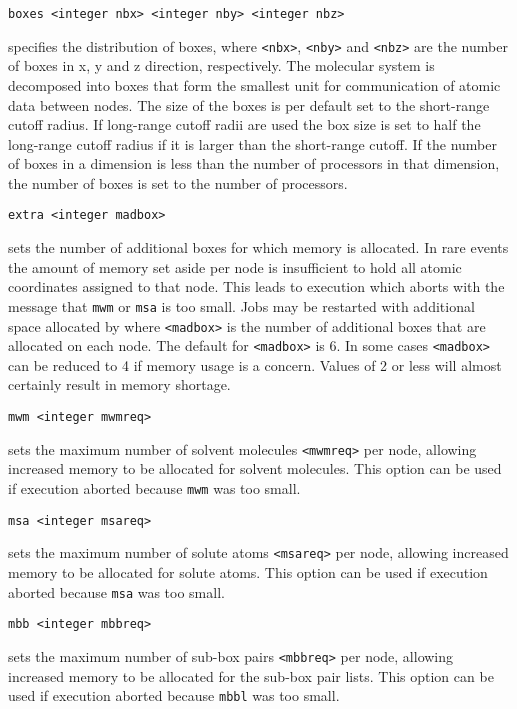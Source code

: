 \begin{description}
\item
\begin{verbatim}
boxes <integer nbx> <integer nby> <integer nbz>
\end{verbatim}
specifies the distribution of boxes,
where \verb+<nbx>+, \verb+<nby>+ and \verb+<nbz>+ are the number of
boxes in x, y and z direction, respectively.
The molecular system is decomposed into boxes that form the smallest
unit for communication of atomic data between nodes. The size of the
boxes is per default set to the short-range cutoff radius. If
long-range cutoff radii  are used the box size is set to half the
long-range cutoff radius if it is larger than the short-range cutoff.
If the number of boxes in a dimension is less than the number of
processors in that dimension, the number of boxes is set to the number
of processors.

\item
\begin{verbatim}
extra <integer madbox>
\end{verbatim}
sets the number of additional boxes for which memory is allocated.
In rare events the amount of memory set aside per node is insufficient
to hold all atomic coordinates assigned to that node. This leads to 
execution which aborts with the message that {\tt mwm} or {\tt msa} is too
small. Jobs may be restarted with additional space allocated by
where \verb+<madbox>+ is the number of additional boxes that are allocated
on each node. The default for \verb+<madbox>+ is 6. 
In some cases \verb+<madbox>+ can be reduced to 4 if memory usage is a
concern. Values of 2 or less will almost certainly result in memory 
shortage.

\item
\begin{verbatim}
mwm <integer mwmreq>
\end{verbatim}
sets the maximum number of solvent molecules \verb+<mwmreq>+ per node,
allowing increased memory to be allocated for solvent molecules. This
option can be used if execution aborted because \verb+mwm+ was too
small.

\item
\begin{verbatim}
msa <integer msareq>
\end{verbatim}
sets the maximum number of solute atoms \verb+<msareq>+ per node,
allowing increased memory to be allocated for solute atoms. This
option can be used if execution aborted because \verb+msa+ was too
small.

\item
\begin{verbatim}
mbb <integer mbbreq>
\end{verbatim}
sets the maximum number of sub-box pairs \verb+<mbbreq>+ per node,
allowing increased memory to be allocated for the sub-box pair lists. 
This option can be used if execution aborted because \verb+mbbl+ was too
small.


\end{description}
